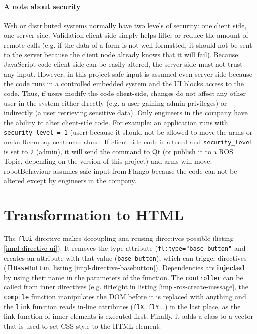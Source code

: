 \paragraph{A note about security} Web or distributed systems normally have two levels of security: one client side, one server side.
Validation client-side simply helps filter or reduce the amount of remote calls (e.g. if the data of a form is not well-formatted, it should not be sent to the server because the client node already knows that it will fail).
Because JavaScript code client-side can be easily altered, the server side must not trust any input.
However, in this project safe input is assumed even server side because the code runs in a controlled embedded system and the \ac{UI} blocks access to the code.
Thus, if users modify the code client-side, changes do not affect any other user in the system either directly (e.g. a user gaining admin privileges) or indirectly (a user retrieving sensitive data).
Only engineers in the company have the ability to alter client-side code.
For example: an application runs with \lstinline$security_level = 1$ (user) because it should not be allowed to move the arms or make Reem say sentences aloud.
If client-side code is altered and \lstinline$security_level$ is set to \lstinline$2$ (admin), it will send the command to Qt (or publish it to a \ac{ROS} Topic, depending on the version of this project) and arms will move.
robotBehaviour assumes safe input from Flango \cm because the code can not be altered except by engineers in the company.

\section{Transformation to \acs{HTML}}
The \texttt{flUi} directive makes decoupling and reusing directives possible (listing \ref{impl-directive-ui}).
It removes the type attribute (\texttt{fl:type="base-button"} and creates an attribute with that value (\texttt{base-button}), which can trigger directives (\texttt{flBaseButton}, listing \ref{impl-directive-basebutton}).
Dependencies are \textbf{injected} by using their name in the parameters of the function.
The \texttt{controller} can be called from inner directives (e.g. flHeight in listing \ref{impl-ros-create-message}, the \texttt{compile} function manipulates the \ac{DOM} before it is replaced with anything and the \texttt{link} function reads in-line attributes (\texttt{flX}, \texttt{flY}...) in the last place, as the link function of inner elements is executed first.
Finally, it adds a class to a vector that is used to set \ac{CSS} style to the \ac{HTML} element.

